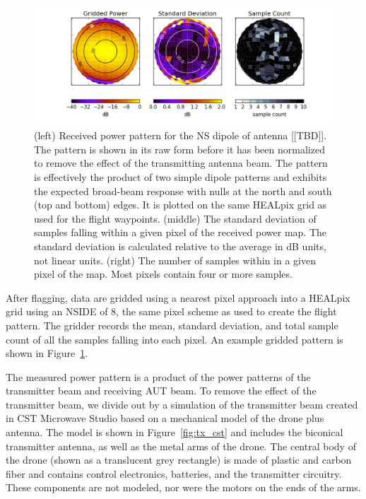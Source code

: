 \documentclass[preprint2,numberedappendix,tighten,twocolappendix]{aastex6}
\begin{document}
\begin{figure}[ht]
\begin{center}
\includegraphics[width=\textwidth]{figures/GB_power_rms_count.png}
\caption{(left) Received power pattern for the NS dipole of antenna [[TBD]].  The pattern is shown in its raw form before it has been normalized to remove the effect of the transmitting antenna beam.  The pattern is effectively the product of two simple dipole patterns and exhibits the expected broad-beam response with nulls at the north and south (top and bottom) edges.  It is plotted on the same HEALpix grid as used for the flight waypoints.   (middle) The standard deviation of samples falling within a given pixel of the received power map. The standard deviation is calculated relative to the average in dB units, not linear units.  (right) The number of samples within in a given pixel of the map. Most pixels contain four or more samples.}
\label{fig:beam_std_count}
\end{center}
\end{figure}

After flagging, data are gridded using a nearest pixel approach into a HEALpix grid using an NSIDE of 8, the same pixel scheme as used to create the flight pattern.  The gridder records the mean, standard deviation, and total sample count of all the samples falling into each pixel. An example gridded pattern is shown in Figure~\ref{fig:beam_std_count}.

The measured power pattern is a product of the power patterns of the transmitter beam and receiving AUT beam. To remove the effect of the transmitter beam, we divide out by a simulation of the transmitter beam created in CST Microwave Studio based on a mechanical model of the drone plus antenna. The model is shown in Figure~\ref{fig:tx_cst} and includes the biconical transmitter antenna, as well as the metal arms of the drone.  The central body of the drone (shown as a translucent grey rectangle) is made of plastic and carbon fiber and contains control electronics, batteries, and the transmitter circuitry. These components are not modeled, nor were the motors on the ends of the arms.   
\end{document}
